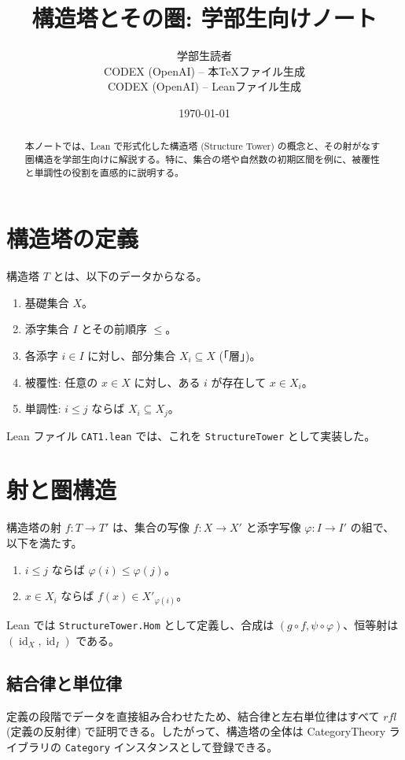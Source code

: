 \documentclass[lualatex]{ltjsarticle}
\title{構造塔とその圏: 学部生向けノート}
\author{学部生読者 \\ CODEX (OpenAI) -- 本TeXファイル生成 \\ CODEX (OpenAI) -- Leanファイル生成}
\date{\today}
\begin{document}
\maketitle

\begin{abstract}
本ノートでは、Lean で形式化した構造塔 (Structure Tower) の概念と、その射がなす圏構造を学部生向けに解説する。特に、集合の塔や自然数の初期区間を例に、被覆性と単調性の役割を直感的に説明する。
\end{abstract}

\section{構造塔の定義}
構造塔 $T$ とは、以下のデータからなる。
\begin{enumerate}[label=\arabic*)]
  \item 基礎集合 $X$。
  \item 添字集合 $I$ とその前順序 $\leq$。
  \item 各添字 $i\in I$ に対し、部分集合 $X_i\subseteq X$ (「層」)。
  \item 被覆性: 任意の $x\in X$ に対し、ある $i$ が存在して $x\in X_i$。
  \item 単調性: $i\leq j$ ならば $X_i\subseteq X_j$。
\end{enumerate}
Lean ファイル \texttt{CAT1.lean} では、これを \texttt{StructureTower} として実装した。

\section{射と圏構造}
構造塔の射 $f\colon T\to T'$ は、集合の写像 $f\colon X\to X'$ と添字写像 $\varphi\colon I\to I'$ の組で、以下を満たす。
\begin{enumerate}[label=\alph*)]
  \item $i\leq j$ ならば $\varphi(i)\leq \varphi(j)$。
  \item $x\in X_i$ ならば $f(x)\in X'_{\varphi(i)}$。
\end{enumerate}
Lean では \texttt{StructureTower.Hom} として定義し、合成は $(g\circ f,\psi\circ\varphi)$、恒等射は $(\operatorname{id}_X,\operatorname{id}_I)$ である。

\subsection{結合律と単位律}
定義の段階でデータを直接組み合わせたため、結合律と左右単位律はすべて $rfl$ (定義の反射律) で証明できる。したがって、構造塔の全体は CategoryTheory ライブラリの \texttt{Category} インスタンスとして登録できる。
\end{document}
